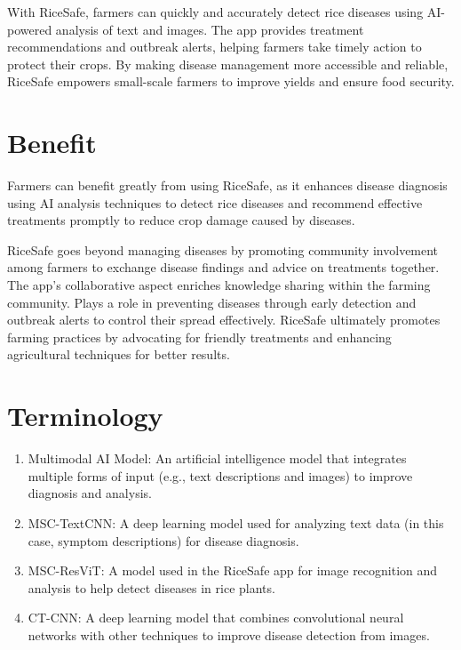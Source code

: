 With RiceSafe, farmers can quickly and accurately detect rice diseases using AI-powered analysis of text and images. The app provides treatment recommendations and outbreak alerts, helping farmers take timely action to protect their crops. By making disease management more accessible and reliable, RiceSafe empowers small-scale farmers to improve yields and ensure food security.


\section{Benefit}
\label{section:benefit}

Farmers can benefit greatly from using RiceSafe, as it enhances disease diagnosis using AI analysis techniques to detect rice diseases and recommend effective treatments promptly to reduce crop damage caused by diseases.

RiceSafe goes beyond managing diseases by promoting community involvement among farmers to exchange disease findings and advice on treatments together. The app's collaborative aspect enriches knowledge sharing within the farming community. Plays a role in preventing diseases through early detection and outbreak alerts to control their spread effectively. RiceSafe ultimately promotes farming practices by advocating for friendly treatments and enhancing agricultural techniques for better results.


\section{Terminology}
\label{section:terminology}

\begin{enumerate}
    \item Multimodal AI Model: An artificial intelligence model that integrates multiple forms of input (e.g., text descriptions and images) to improve diagnosis and analysis.
    \item MSC-TextCNN: A deep learning model used for analyzing text data (in this case, symptom descriptions) for disease diagnosis.
    \item MSC-ResViT: A model used in the RiceSafe app for image recognition and analysis to help detect diseases in rice plants.
    \item CT-CNN: A deep learning model that combines convolutional neural networks with other techniques to improve disease detection from images.
\end{enumerate}